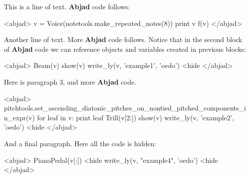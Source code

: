 \documentclass[11pt]{article}
\begin{document}
This is a line of text. \textbf{Abjad} code follows:

<abjad>
v = Voice(notetools.make_repeated_notes(8))
print v
f(v)
</abjad>

Another line of text. More \textbf{Abjad} code follows. Notice that in the second block of \textbf{Abjad} code we can reference objects and variables created in previous blocks:

<abjad>
Beam(v)
show(v)
write_ly(v, 'example1', 'oedo') <hide
</abjad>

Here is paragraph 3, and more \textbf{Abjad} code.

<abjad>
pitchtools.set_ascending_diatonic_pitches_on_nontied_pitched_components_in_expr(v)
for leaf in v: print leaf
Trill(v[2:])
show(v)
write_ly(v, 'example2', 'oedo') <hide
</abjad>

And a final paragraph. Here all the code is hidden:

<abjad>
PianoPedal(v[:]) <hide
write_ly(v, "example4", 'oedo') <hide
</abjad>
\end{document}
